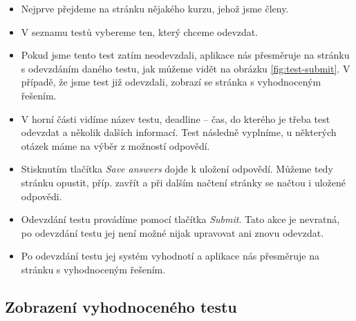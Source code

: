 \begin{itemize}
	\item Nejprve přejdeme na stránku nějakého kurzu, jehož jsme členy.
	\item V seznamu testů vybereme ten, který chceme odevzdat.
	\item Pokud jsme tento test zatím neodevzdali, aplikace nás přesměruje na strá\-nku s odevzdáním daného testu, jak můžeme vidět na obrázku \ref{fig:test-submit}. V případě, že jsme test již odevzdali, zobrazí se stránka s vyhodnoceným řešením.
	\item V horní části vidíme název testu, deadline -- čas, do kterého je třeba test odevzdat a několik dalších informací. Test následně vyplníme, u některých otázek máme na výběr z možností odpovědí.
	\item Stisknutím tlačítka \textit{Save answers} dojde k uložení odpovědí. Můžeme tedy stránku opustit, příp. zavřít a při dalším načtení stránky se načtou i uložené odpovědi.
	\item Odevzdání testu provádíme pomocí tlačítka \textit{Submit}. Tato akce je nevratná, po odevzdání testu jej není možné nijak upravovat ani znovu odevzdat.
	\item Po odevzdání testu jej systém vyhodnotí a aplikace nás přesměruje na stránku s vyhodnoceným řešením.
\end{itemize}

\subsection{Zobrazení vyhodnoceného testu}

